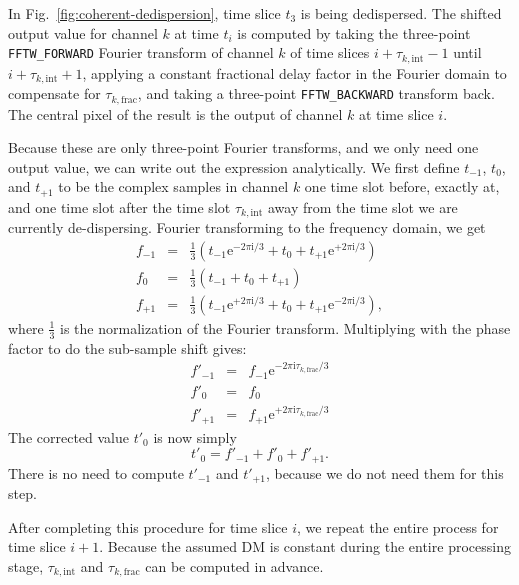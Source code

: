 \documentclass[a4paper,twoside]{article}
\newcommand{\dm}{\mathrm{DM}}
\newcommand{\fftwforward}{\texttt{FFTW\_FORWARD}\xspace}
\newcommand{\fftwbackward}{\texttt{FFTW\_BACKWARD}\xspace}
\begin{document}
In Fig.~\ref{fig:coherent-dedispersion}, time slice $t_3$ is being
dedispersed. The shifted output value for channel $k$ at time $t_i$ is
computed by taking the three-point \fftwforward Fourier transform of
channel $k$ of time slices ${i+\tau_{k, \mathrm{int}}-1}$ until
${i+\tau_{k, \mathrm{int}}+1}$, applying a constant fractional delay
factor in the Fourier domain to compensate for $\tau_{k,
  \mathrm{frac}}$, and taking a three-point \fftwbackward transform
back. The central pixel of the result is the output of channel $k$ at
time slice $i$.

Because these are only three-point Fourier transforms, and we only
need one output value, we can write out the expression
analytically. We first define $t_{-1}$, $t_0$, and $t_{+1}$
to be the complex samples in channel $k$ one time slot before, exactly
at, and one time slot after the time slot $\tau_{k, \mathrm{int}}$
away from the time slot we are currently de-dispersing. Fourier
transforming to the frequency domain, we get
\begin{eqnarray}
f_{-1} & = & \frac{1}{3} \left(t_{-1}\mathrm{e}^{-2\pi\mathrm{i}/3} + t_{0} + t_{+1}\mathrm{e}^{+2\pi\mathrm{i}/3}\right)\\
f_{0}  & = & \frac{1}{3} \left(t_{-1} + t_{0} + t_{+1}\right)\\
f_{+1} & = & \frac{1}{3} \left(t_{-1}\mathrm{e}^{+2\pi\mathrm{i}/3} + t_{0} + t_{+1}\mathrm{e}^{-2\pi\mathrm{i}/3}\right),
\end{eqnarray}
where $\frac{1}{3}$ is the normalization of the Fourier
transform. Multiplying with the phase factor to do the sub-sample
shift gives:
\begin{eqnarray}
f'_{-1} & = & f_{-1} \mathrm{e}^{-2\pi\mathrm{i}\tau_{k, \mathrm{frac}}/3}\\
f'_{0}  & = & f_{0}\\
f'_{+1} & = & f_{+1} \mathrm{e}^{+2\pi\mathrm{i}\tau_{k, \mathrm{frac}}/3}
\end{eqnarray}
The corrected value $t'_0$ is now simply
\begin{equation}
t'_0  =  f'_{-1} + f'_{0} + f'_{+1}.
\end{equation}
There is no need to compute $t'_{-1}$ and $t'_{+1}$, because we do not
need them for this step.

After completing this procedure for time slice $i$, we repeat the
entire process for time slice $i+1$. Because the assumed $\dm$ is
constant during the entire processing stage, $\tau_{k, \mathrm{int}}$
and $\tau_{k, \mathrm{frac}}$ can be computed in advance.
\end{document}
